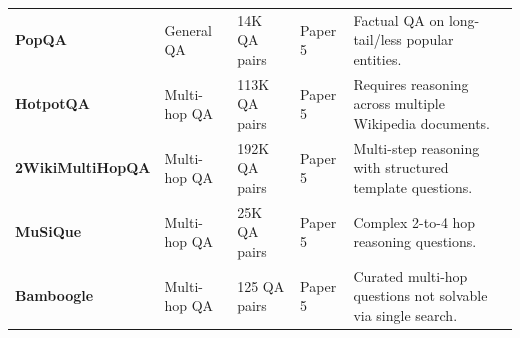 \documentclass[11pt,a4paper]{article}
\begin{document}
\begin{table}[htbp]
{\begin{tabular}{lllll}
\textbf{PopQA} & General QA & 14K QA pairs & Paper 5 & Factual QA on long-tail/less popular entities. \\
\textbf{HotpotQA} & Multi-hop QA & 113K QA pairs & Paper 5 & Requires reasoning across multiple Wikipedia documents. \\
\textbf{2WikiMultiHopQA} & Multi-hop QA & 192K QA pairs & Paper 5 & Multi-step reasoning with structured template questions. \\
\textbf{MuSiQue} & Multi-hop QA & 25K QA pairs & Paper 5 & Complex 2-to-4 hop reasoning questions. \\
\textbf{Bamboogle} & Multi-hop QA & 125 QA pairs & Paper 5 & Curated multi-hop questions not solvable via single search. \\
\bottomrule
\end{tabular}%
}
\end{table}
\end{document}
